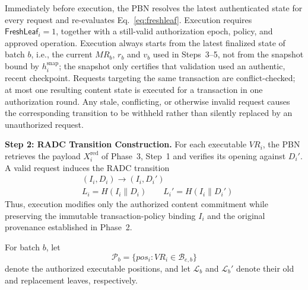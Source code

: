 \documentclass[lettersize,journal]{IEEEtran}
\begin{document}
Immediately before execution, the PBN resolves the latest authenticated
state for every request and re-evaluates
Eq.~\eqref{eq:freshleaf}.
Execution requires
$\mathsf{FreshLeaf}_i=1$,
together with a still-valid authorization epoch, policy, and approved
operation. Execution always starts from the latest
finalized state of batch $b$, i.e., the current $MR_b$, $r_b$ and $v_b$
used in Steps~3--5, not from the snapshot bound by $h_i^{\mathrm{snap}}$;
the snapshot only certifies that validation used an authentic, recent
checkpoint. Requests targeting the same transaction are conflict-checked;
at most one resulting content state is executed for a transaction in
one authorization round. Any stale, conflicting, or otherwise invalid
request causes the corresponding transition to be withheld rather than
silently replaced by an unauthorized request.

\medskip
\noindent\textbf{Step 2: RADC Transition Construction.}
For each executable $VR_i$, the PBN retrieves the payload
$X_i^{\mathrm{red}}$ of Phase~3, Step~1 and verifies its opening against
$D_i'$. A valid request induces the RADC transition
\begin{equation}
\begin{aligned}
&(I_i,D_i)\longrightarrow(I_i,D_i')\\
&L_i=H(I_i\parallel D_i)\qquad L_i'=H(I_i\parallel D_i')
\end{aligned}
\end{equation}
Thus, execution modifies only the authorized content commitment while
preserving the immutable transaction-policy binding $I_i$ and the
original provenance established in Phase~2.

For batch $b$, let
\begin{equation}
\mathcal{P}_b=
\{pos_i:VR_i\in\mathcal{B}_{e,b}\}
\end{equation}
denote the authorized executable positions, and let
$\mathcal{L}_b$ and $\mathcal{L}_b'$ denote their old and replacement
leaves, respectively.
\end{document}
